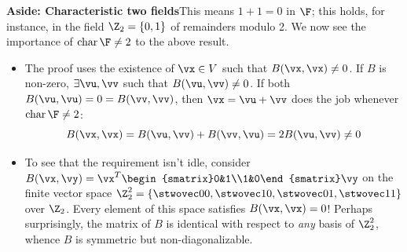 \begin{aside}{}{}
{\bfseries Aside: Characteristic two fields}\quad This means $1+1=0$ in $\F$; this holds, for instance, in the field $\Z_2=\{0,1\}$ of remainders modulo 2. We now see the importance of $\operatorname{char}\F\neq 2$ to the above result.
\begin{itemize}
	\item The proof uses the existence of $\vx\in V$ such that $B(\vx,\vx)\neq 0$. If $B$ is non-zero, $\exists\vu,\vv$ such that $B(\vu,\vv)\neq 0$. If both $B(\vu,\vu)=0=B(\vv,\vv)$, then $\vx=\vu+\vv$ does the job whenever $\operatorname{char}\F\neq 2$:
	\[B(\vx,\vx)=B(\vu,\vv)+B(\vv,\vu)=2B(\vu,\vv)\neq 0\]

	\item To see that the requirement isn't idle, consider $B(\vx,\vy)=\vx^T\begin{smatrix}0&1\\1&0\end{smatrix}\vy$ on the finite vector space $\Z_2^2=\{\stwovec 00,\stwovec 10,\stwovec 01,\stwovec 11\}$ over $\Z_2$. Every element of this space satisfies $B(\vx,\vx)=0$! Perhaps surprisingly, the matrix of $B$ is identical with respect to \emph{any} basis of $\Z_2^2$, whence $B$ is symmetric but non-diagonalizable.
\end{itemize}


\end{aside}

